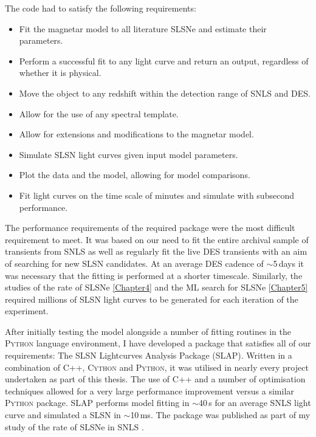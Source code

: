 The code had to satisfy the following requirements:
\begin{itemize}
  \item Fit the magnetar model to all literature SLSNe and estimate their parameters.
  \item Perform a successful fit to any light curve and return an output, regardless of whether it is physical.
  \item Move the object to any redshift within the detection range of SNLS and DES.
  \item Allow for the use of any spectral template.
  \item Allow for extensions and modifications to the magnetar model.
  \item Simulate SLSN light curves given input model parameters.
  \item Plot the data and the model, allowing for model comparisons.
  \item Fit light curves on the time scale of minutes and simulate with subsecond performance.
\end{itemize}

The performance requirements of the required package were the most difficult requirement to meet. It was based on our need to fit the entire archival sample of transients from SNLS as well as regularly fit the live DES transients with an aim of searching for new SLSN candidates. At an average DES cadence of $\sim$5\,days it was necessary that the fitting is performed at a shorter timescale. Similarly, the studies of the rate of SLSNe \cref{Chapter4} and the ML search for SLSNe \cref{Chapter5} required millions of SLSN light curves to be generated for each iteration of the experiment.

After initially testing the model alongside a number of fitting routines in the \textsc{Python} language environment, I have developed a package that satisfies all of our requirements: The SLSN Lightcurves Analysis Package (SLAP). Written in a combination of \textsc{C++}, \textsc{Cython} and \textsc{Python}, it was utilised in nearly every project undertaken as part of this thesis. The use of C++ and a number of optimisation techniques allowed for a very large performance improvement versus a similar \textsc{Python} package. \textsc{SLAP} performs model fitting in $\sim$40\,s for an average SNLS light curve and simulated a SLSN in $\sim$10\,ms. The package was published as part of my study of the rate of SLSNe in SNLS \citep{Prajs2016}.

